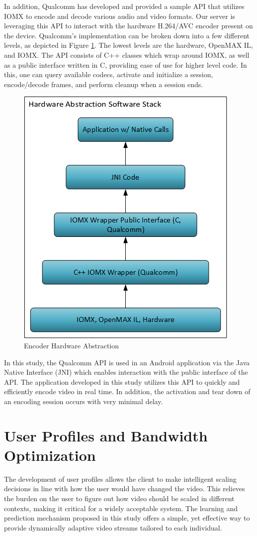 \documentclass[a4paper,12pt]{article}
\begin{document}
In addition, Qualcomm has developed and provided a sample API that utilizes IOMX to encode and decode various audio and video formats. Our server is leveraging this API to interact with the hardware H.264/AVC encoder present on the device. Qualcomm's implementation can be broken down into a few different levels, as depicted in Figure \ref{fig:QualcommAPI}. The lowest levels are the hardware, OpenMAX IL, and IOMX. The API consists of C++ classes which wrap around IOMX, as well as a public interface written in C, providing ease of use for higher level code. In this, one can query available codecs, activate and initialize a session, encode/decode frames, and perform cleanup when a session ends.
\begin{figure}[h]
\centering
\includegraphics[width=0.4\linewidth]{QualcommAPI.png}
\caption{Encoder Hardware Abstraction}
\label{fig:QualcommAPI}
\end{figure}
In this study, the Qualcomm API is used in an Android application via the Java Native Interface (JNI) which enables interaction with the public interface of the API. The application developed in this study utilizes this API to quickly and efficiently encode video in real time. In addition, the activation and tear down of an encoding session occurs with very minimal delay.


\section{User Profiles and Bandwidth Optimization}
\label{sec:UserProfiles}

The development of user profiles allows the client to make intelligent scaling decisions in line with how the user would have changed the video. This relieves the burden on the user to figure out how video should be scaled in different contexts, making it critical for a widely acceptable system. The learning and prediction mechanism proposed in this study offers a simple, yet effective way to provide dynamically adaptive video streams tailored to each individual.
\end{document}
